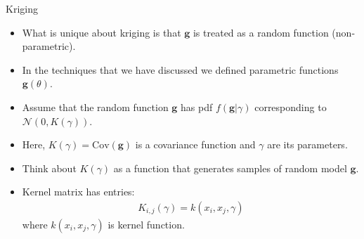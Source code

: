 \documentclass[9pt]{beamer}
\begin{document}

\begin{frame}{Kriging}

\begin{itemize}
  \setlength{\itemsep}{10pt}
\item What is unique about kriging is that $\mathbf{g}$ is treated as a random function (non-parametric). 

\item In the techniques that we have discussed we defined parametric functions $\mathbf{g}(\theta)$.

\item Assume that the random function $\mathbf{g}$ has pdf $f(\mathbf{g}|\gamma)$ corresponding to $\mathcal{N}(0,K(\gamma))$.  

\item Here, $K(\gamma)=\textrm{Cov}(\mathbf{g})$ is a covariance function and $\gamma$ are its parameters.  

\item Think about $K(\gamma)$ as a function that generates samples of random model $\mathbf{g}$. 

\item Kernel matrix has entries:
\begin{align}
K_{i,j}(\gamma)=k(x_i,x_j,\gamma)
\end{align}
where $k(x_i,x_j,\gamma)$ is kernel function. 

\end{itemize}


\end{frame}

\end{document}
